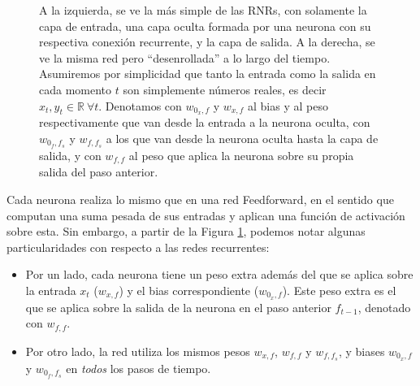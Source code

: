 \documentclass[../../main.tex]{subfiles}
\begin{document}
\begin{figure}[ht]
    \caption{A la izquierda, se ve la más simple de las RNRs, con solamente la capa de
    entrada, una capa oculta formada por una neurona con su respectiva conexión
    recurrente, y la capa de salida. A la derecha, se ve la misma red pero
    ``desenrollada'' a lo largo del tiempo. Asumiremos por simplicidad que tanto la
    entrada como la salida en cada momento \(t\) son simplemente números reales, es decir
    \(x_t, y_t \in \mathbb{R} \ \forall t\). Denotamos con \(w_{0_x,f}\) y \(w_{x,f}\) al
    bias y al peso respectivamente que van desde la entrada a la neurona oculta, con
    \(w_{0_f,f_s}\) y \(w_{f,f_s}\) a los que van desde la neurona oculta hasta la capa de
    salida, y con \(w_{f,f}\) al peso que aplica la neurona sobre su propia salida del
    paso anterior.}
    \label{fig:simple-rnn}
\end{figure}

Cada neurona realiza lo mismo que en una red Feedforward, en el sentido que computan una
suma pesada de sus entradas y aplican una función de activación sobre esta. Sin embargo, a
partir de la Figura \ref{fig:simple-rnn}, podemos notar algunas particularidades con
respecto a las redes recurrentes:
\begin{itemize}
    \item Por un lado, cada neurona tiene un peso extra además del que se aplica sobre la
    entrada \(x_t\) (\(w_{x,f}\)) y el bias correspondiente (\(w_{0_x,f}\)). Este peso
    extra es el que se aplica sobre la salida de la neurona en el paso anterior
    \(f_{t-1}\), denotado con \(w_{f,f}\).
    \item Por otro lado, la red utiliza los mismos pesos \(w_{x,f}\), \(w_{f,f}\) y
    \(w_{f, f_s}\), y biases \(w_{0_x,f}\) y \(w_{0_f, f_s}\) en \textit{todos} los pasos de
    tiempo.
\end{itemize}
\end{document}
